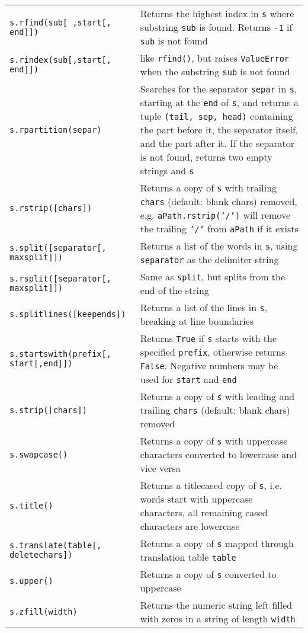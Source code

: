 \begin{longtable}{|p{5cm}|p{10cm}|}
\tt s.rfind(sub[ ,start[,\newline
\mbox{}\hfill end]]) 				& Returns the highest index in {\tt s} where substring {\tt sub} is found. Returns {\tt -1} if {\tt sub} is not found\\ 	
\tt s.rindex(sub[,start[,\newline
\mbox{}\hfill end]]) 				& like {\tt rfind()}, but raises {\tt ValueError} when the substring {\tt sub} is not found\\ 	
\tt s.rpartition(separ) 			& Searches for the separator {\tt separ} in {\tt s}, starting at the {\tt end} of {\tt s}, and returns a tuple 
				 		  {\tt (tail, sep, head)} containing the part before it, the separator itself, and the part after it. 
				 		  If the separator is not found, returns two empty strings and {\tt s}\\ 	
\tt s.rstrip([chars]) 				& Returns a copy of {\tt s} with trailing {\tt chars} (default: blank chars) removed, 
			 			  e.g. {\tt aPath.rstrip('/')} will remove the trailing {\tt '/'} from {\tt aPath} if it exists\\	
\tt s.split([separator[,\newline
\mbox{}\hfill maxsplit]]) 			& Returns a list of the words in {\tt s}, using {\tt separator} as the delimiter string\\	
\tt s.rsplit([separator[,\newline
\mbox{}\hfill maxsplit]]) 			& Same as {\tt split}, but splits from the end of the string\\
\tt s.splitlines([keepends]) 			& Returns a list of the lines in {\tt s}, breaking at line boundaries\\	
\tt s.startswith(prefix[,\newline
\mbox{}\hfill start[,end]]) 			& Returns {\tt True} if {\tt s} starts with the specified {\tt prefix}, otherwise returns {\tt False}. 
                                                  Negative numbers may be used for {\tt start} and {\tt end}\\	
\tt s.strip([chars]) 				& Returns a copy of {\tt s} with leading and trailing {\tt chars} (default: blank chars) removed\\ 	
\tt s.swapcase() 				& Returns a copy of {\tt s} with uppercase characters converted to lowercase and vice versa\\
\tt s.title() 					& Returns a titlecased copy of {\tt s}, i.e. words start with uppercase characters, all remaining cased characters are lowercase\\ 	
\tt s.translate(table[,\newline
\mbox{}\hfill deletechars]) 			& Returns a copy of {\tt s} mapped through translation table {\tt table}\\ 	
\tt s.upper() 					& Returns a copy of {\tt s} converted to uppercase\\
\tt s.zfill(width) 				& Returns the numeric string left filled with zeros in a string of length {\tt width}\\ 	 
\hline
\end{longtable}


